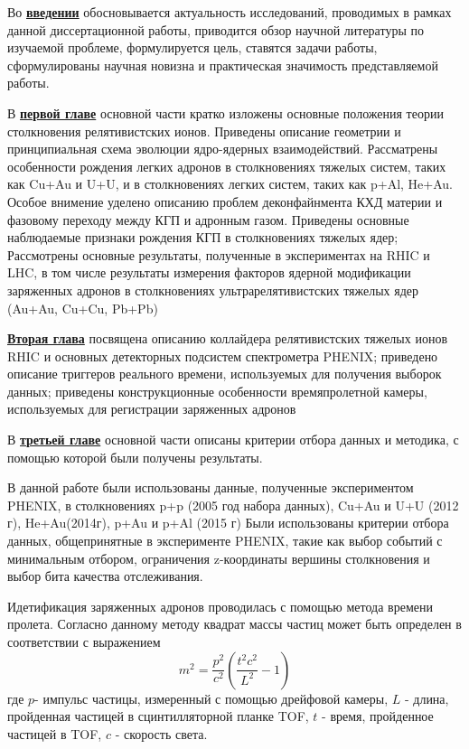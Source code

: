 Во \underline{\textbf{введении}} обосновывается актуальность исследований, проводимых в рамках данной диссертационной работы, приводится обзор научной литературы по изучаемой проблеме, формулируется цель, ставятся задачи работы, сформулированы научная новизна и практическая значимость представляемой работы.

В \underline{\textbf{первой главе}} основной части кратко изложены основные положения теории столкновения релятивистских ионов.  Приведены описание геометрии и принципиальная схема эволюции ядро-ядерных взаимодействий. Рассматрены особенности рождения легких адронов в столкновениях тяжелых систем, таких как Cu+Au и U+U, и в столкновениях легких систем, таких как p+Al, He+Au. Особое внимение уделено описанию проблем деконфайнмента КХД материи и фазовому переходу между КГП и адронным газом. Приведены основные наблюдаемые признаки рождения КГП в столкновениях тяжелых ядер; Рассмотрены основные результаты, полученные в экспериментах на RHIC и LHC, в том числе результаты измерения факторов ядерной модификации заряженных адронов в столкновениях ультрарелятивистских тяжелых ядер (Au+Au, Cu+Cu, Pb+Pb)

\underline{\textbf{Вторая глава}} посвящена описанию коллайдера релятивистских тяжелых ионов RHIC и основных детекторных подсистем спектрометра PHENIX; приведено описание триггеров реального времени, используемых для получения выборок данных; приведены конструкционные особенности времяпролетной камеры, используемых для регистрации заряженных адронов

В \underline{\textbf{третьей главе}} основной части описаны критерии отбора данных и методика, с помощью которой были получены результаты.

В данной работе были использованы данные, полученные экспериментом PHENIX, в столкновениях p+p (2005 год набора данных), Cu+Au и U+U (2012 г), He+Au(2014г), p+Au и p+Al (2015 г)
Были использованы критерии отбора данных, общепринятные в эксперименте PHENIX, такие как выбор событий с минимальным отбором, ограничения z-координаты вершины столкновения и выбор бита качества отслеживания. 

Идетификация заряженных адронов проводилась с помощью метода времени пролета. Согласно данному методу  квадрат массы частиц может быть определен в соответствии с выражением 
$$m^2 = \frac{p^2}{c^2} \left(  \frac{t^2 c^2}{L^2} - 1\right)$$
где $p$- импульс частицы, измеренный с помощью дрейфовой камеры, $L$ - длина, пройденная частицей в сцинтилляторной планке TOF, $t$ - время, пройденное частицей в TOF,  $c$ - скорость света.

